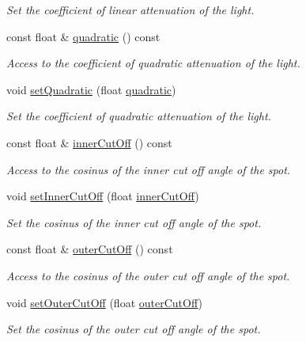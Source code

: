 \begin{DoxyCompactItemize}
\begin{DoxyCompactList}\small\item\em Set the coefficient of linear attenuation of the light. \end{DoxyCompactList}\item 
const float \& \hyperlink{classSpotLight_af30e894a67433d26393c2014a9033f1e}{quadratic} () const 
\begin{DoxyCompactList}\small\item\em Access to the coefficient of quadratic attenuation of the light. \end{DoxyCompactList}\item 
void \hyperlink{classSpotLight_a4ca75b46bacac76bd8684a1c88341e6d}{set\+Quadratic} (float \hyperlink{classSpotLight_af30e894a67433d26393c2014a9033f1e}{quadratic})
\begin{DoxyCompactList}\small\item\em Set the coefficient of quadratic attenuation of the light. \end{DoxyCompactList}\item 
const float \& \hyperlink{classSpotLight_a591b58209ca0783c963ac42b5ff0dafb}{inner\+Cut\+Off} () const 
\begin{DoxyCompactList}\small\item\em Access to the cosinus of the inner cut off angle of the spot. \end{DoxyCompactList}\item 
void \hyperlink{classSpotLight_adae6ef8846a33afeb379dfb39142799a}{set\+Inner\+Cut\+Off} (float \hyperlink{classSpotLight_a591b58209ca0783c963ac42b5ff0dafb}{inner\+Cut\+Off})
\begin{DoxyCompactList}\small\item\em Set the cosinus of the inner cut off angle of the spot. \end{DoxyCompactList}\item 
const float \& \hyperlink{classSpotLight_a68177100b781d157b98a02b144938c51}{outer\+Cut\+Off} () const 
\begin{DoxyCompactList}\small\item\em Access to the cosinus of the outer cut off angle of the spot. \end{DoxyCompactList}\item 
void \hyperlink{classSpotLight_a53217911a646632e3ae54c0c19343dd2}{set\+Outer\+Cut\+Off} (float \hyperlink{classSpotLight_a68177100b781d157b98a02b144938c51}{outer\+Cut\+Off})
\begin{DoxyCompactList}\small\item\em Set the cosinus of the outer cut off angle of the spot. \end{DoxyCompactList}\end{DoxyCompactItemize}
